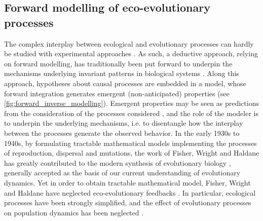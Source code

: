 \subsection{Forward modelling of eco-evolutionary processes}
The complex interplay between ecological and evolutionary processes can hardly be studied with experimental approaches \citep{Pontarp2019,Hagen2022}. 
As such, a deductive approach, relying on forward modelling, has traditionally been put forward to underpin the mechanisms underlying invariant patterns in biological systems \citep{Brummitt2020}. Along this approach, hypotheses about causal processes are embedded in a model, whose forward integration generates emergent (non-anticipated) properties (see \cref{fig:forward_inverse_modelling}). Emergent properties may be seen as predictions from the consideration of the processes considered \citep{May2004}, and the role of the modeler is to underpin the underlying mechanisms, i.e. to disentangle how the interplay between the processes generate the observed behavior. 
% 
% 
In the early 1930s to 1940s, by formulating tractable mathematical models implementing the processes of reproduction, dispersal and mutations, the work of Fisher, Wright and Haldane has greatly contributed to the modern synthesis of evolutionary biology \citep{huxley1942evolution}, generally accepted as the basis of our current understanding of evolutionary dynamics. 
% 
% 
Yet in order to obtain tractable mathematical model, Fisher, Wright and Haldane have neglected eco-evolutionary feedbacks \citep{Govaert2019}. In particular, ecological processes have been strongly simplified, and the effect of evolutionary processes on population dynamics has been neglected \citep{Lion2022}.

